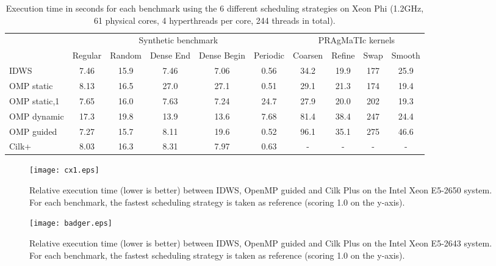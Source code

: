 \documentclass{acm_proc_article-sp}
\newcommand{\PRAGMATIC}{PRAgMaTIc\xspace}
\begin{document}
\begin{table*}[h]
\begin{center}
\begin{tabular}[c]{|l|c|c|c|c|c||c|c|c|c|}
\cline{2-10}
\multicolumn{1}{c|}{}	& \multicolumn{5}{|c||}{Synthetic benchmark}		& \multicolumn{4}{c|}{\PRAGMATIC kernels}	\\ \cline{2-10}
\multicolumn{1}{c|}{}	& Regular	& Random	& Dense End	& Dense Begin	& Periodic	& Coarsen	& Refine	& Swap	& Smooth \\ \hline
IDWS					& 7.46		& 15.9		& 7.46		& 7.06			& 0.56		& 34.2		& 19.9		& 177	& 25.9   \\ \hline
OMP static				& 8.13		& 16.5		& 27.0		& 27.1			& 0.51		& 29.1		& 21.3		& 174	& 19.4   \\ \hline
OMP static,1			& 7.65		& 16.0		& 7.63		& 7.24			& 24.7		& 27.9		& 20.0		& 202	& 19.3   \\ \hline
OMP dynamic				& 17.3		& 19.8		& 13.9		& 13.6			& 7.68		& 81.4		& 38.4		& 247	& 24.4   \\ \hline
OMP guided				& 7.27		& 15.7		& 8.11		& 19.6			& 0.52		& 96.1		& 35.1		& 275	& 46.6   \\ \hline
Cilk+					& 8.03		& 16.3		& 8.31		& 7.97			& 0.63		& -			& -			& -		& -      \\ \hline
\end{tabular}
\caption{Execution time in seconds for each benchmark using the 6 different 
scheduling strategies on Xeon Phi (1.2GHz, 61 physical cores, 4 hyperthreads 
per core, 244 threads in total).}
\label{tab:performance_phi_240}
\end{center}
\end{table*}

\begin{figure}[h]
\begin{center}
\texttt{[image: cx1.eps]}
\caption{Relative execution time (lower is better) between IDWS, OpenMP guided
and Cilk Plus on the Intel Xeon E5-2650 system. For each benchmark, the fastest
scheduling strategy is taken as reference (scoring 1.0 on the y-axis).}
\label{fig:cx1}
\end{center}
\end{figure}

\begin{figure}[h]
\begin{center}
\texttt{[image: badger.eps]}
\caption{Relative execution time (lower is better) between IDWS, OpenMP guided
and Cilk Plus on the Intel Xeon E5-2643 system. For each benchmark, the fastest
scheduling strategy is taken as reference (scoring 1.0 on the y-axis).}
\label{fig:badger}
\end{center}
\end{figure}
\end{document}
